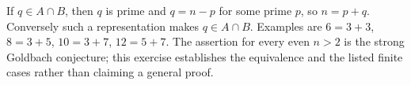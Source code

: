 If $q\in A\cap B$, then $q$ is prime and $q=n-p$ for some prime $p$, so $n=p+q$. Conversely such a representation makes $q\in A\cap B$. Examples are $6=3+3$, $8=3+5$, $10=3+7$, $12=5+7$. The assertion for every even $n>2$ is the strong Goldbach conjecture; this exercise establishes the equivalence and the listed finite cases rather than claiming a general proof.

